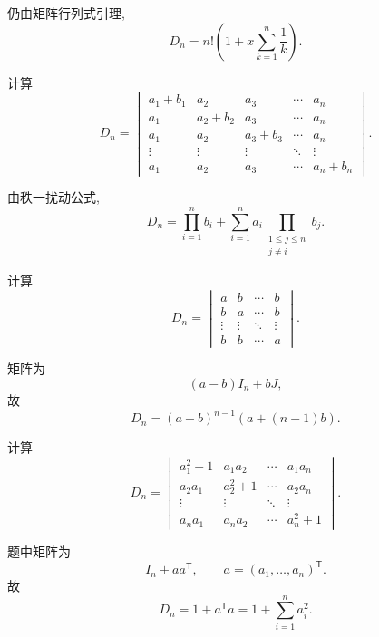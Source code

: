 \begin{solution}
仍由矩阵行列式引理,
\[
\boxed{
D_n
=
n!
\left(
1+x\sum\limits_{k=1}^{n}\dfrac{1}{k}
\right)
}.
\]
\end{solution}


\begin{example}
计算
\[
D_n=
\begin{vmatrix}
a_1+b_1&a_2&a_3&\cdots&a_n\\
a_1&a_2+b_2&a_3&\cdots&a_n\\
a_1&a_2&a_3+b_3&\cdots&a_n\\
\vdots&\vdots&\vdots&\ddots&\vdots\\
a_1&a_2&a_3&\cdots&a_n+b_n
\end{vmatrix}.
\]
\end{example}
\exampleblank

\begin{solution}
由秩一扰动公式,
\[
\boxed{
D_n
=
\prod\limits_{i=1}^{n}b_i
+
\sum\limits_{i=1}^{n}
a_i
\prod_{\substack{1\leq j\leq n\\j\neq i}}b_j
}.
\]
\end{solution}


\begin{example}
计算
\[
D_n=
\begin{vmatrix}
a&b&\cdots&b\\
b&a&\cdots&b\\
\vdots&\vdots&\ddots&\vdots\\
b&b&\cdots&a
\end{vmatrix}.
\]
\end{example}
\exampleblank

\begin{solution}
矩阵为
\[
(a-b)I_n+bJ,
\]
故
\[
\boxed{
D_n=(a-b)^{n-1}\left(a+(n-1)b\right)
}.
\]
\end{solution}


\begin{example}
计算
\[
D_n=
\begin{vmatrix}
a_1^2+1&a_1a_2&\cdots&a_1a_n\\
a_2a_1&a_2^2+1&\cdots&a_2a_n\\
\vdots&\vdots&\ddots&\vdots\\
a_na_1&a_na_2&\cdots&a_n^2+1
\end{vmatrix}.
\]
\end{example}
\exampleblank

\begin{solution}
题中矩阵为
\[
I_n+aa^{\mathsf T},
\qquad
a=(a_1,\ldots,a_n)^{\mathsf T}.
\]
故
\[
\boxed{
D_n=1+a^{\mathsf T}a
=
1+\sum\limits_{i=1}^{n}a_i^2
}.
\]
\end{solution}


